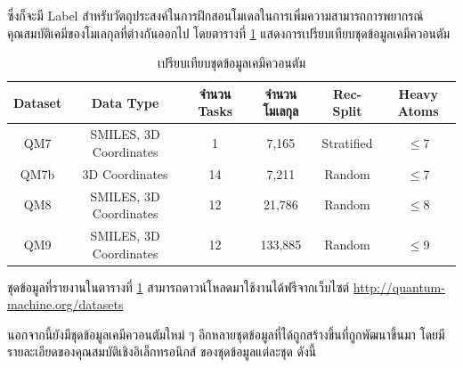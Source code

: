 \noindent ซึ่งก็จะมี Label สำหรับวัตถุประสงค์ในการฝึกสอนโมเดลในการเพิ่มความสามารถการพยากรณ์คุณสมบัติเคมีของโมเลกุลที่ต่างกันออกไป 
โดยตารางที่ \ref{tab:compare_qm_dataset} แสดงการเปรียบเทียบชุดข้อมูลเคมีควอนตัม

\begin{table}[H]
    \centering
    \caption{เปรียบเทียบชุดข้อมูลเคมีควอนตัม}
    \label{tab:compare_qm_dataset}
    \begin{tabular}{cccccc}
    \toprule
    \textbf{Dataset} &\textbf{Data Type} &\textbf{จำนวน Tasks} &\textbf{จำนวนโมเลกุล} 
    &\textbf{Rec-Split} &\textbf{Heavy Atoms} \\
    \midrule
    QM7 &SMILES, 3D Coordinates &1 &7,165 &Stratified &$\leq$7 \\
    QM7b &3D Coordinates &14 &7,211 &Random &$\leq$7 \\
    QM8 &SMILES, 3D Coordinates &12 &21,786 &Random &$\leq$8 \\
    QM9 &SMILES, 3D Coordinates &12 &133,885 &Random &$\leq$9 \\
    \bottomrule
    \end{tabular}
\end{table}

ชุดข้อมูลที่รายงานในตารางที่ \ref{tab:compare_qm_dataset} สามารถดาวน์โหลดมาใช้งานได้ฟรีจากเว็บไซต์ 
\url{http://quantum-machine.org/datasets} 

นอกจากนี้ยังมีชุดข้อมูลเคมีควอนตัมใหม่ ๆ อีกหลายชุดข้อมูลที่ได้ถูกสร้างขึ้นที่ถูกพัฒนาขึ้นมา โดยมีรายละเอียดของคุณสมบัติเชิงอิเล็กทรอนิกส์%
ของชุดข้อมูลแต่ละชุด ดังนี้

